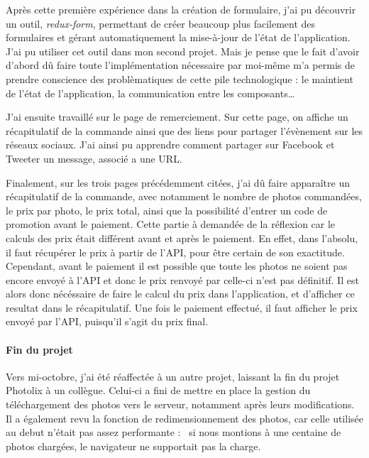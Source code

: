 \documentclass[12pt,a4paper]{article}
\begin{document}
  \bigskip

  Après cette première expérience dans la création de formulaire, j'ai pu
  découvrir un outil, \emph{redux-form}, permettant de créer beaucoup plus
  facilement des formulaires et gérant automatiquement la mise-à-jour de
  l'état de l'application. J'ai pu utiliser cet outil dans mon second
  projet. Mais je pense que le fait d'avoir d'abord dû faire toute
  l'implémentation nécessaire par moi-même m'a permis de prendre
  conscience des problèmatiques de cette pile technologique : le maintient
  de l'état de l'application, la communication entre les
  composants\ldots{}

  \bigskip

  J'ai ensuite travaillé sur le page de remerciement. Sur cette page, on
  affiche un récapitulatif de la commande ainsi que des liens pour
  partager l'évènement sur les réseaux sociaux. J'ai ainsi pu apprendre
  comment partager sur Facebook et Tweeter un message, associé a une URL.

  \bigskip

  Finalement, sur les trois pages précédemment citées, j'ai dû faire
  apparaître un récapitulatif de la commande, avec notamment le nombre de
  photos commandées, le prix par photo, le prix total, ainsi que la
  possibilité d'entrer un code de promotion avant le paiement. Cette
  partie à demandée de la réflexion car le calculs des prix était
  différent avant et après le paiement. En effet, dans l'absolu, il faut
  récupérer le prix à partir de l'API, pour être certain de son
  exactitude. Cependant, avant le paiement il est possible que toute les
  photos ne soient pas encore envoyé à l'API et donc le prix renvoyé par
  celle-ci n'est pas définitif. Il est alors donc nécéssaire de faire le
  calcul du prix dans l'application, et d'afficher ce resultat dans le
  récapitulatif. Une fois le paiement effectué, il faut afficher le prix
  envoyé par l'API, puisqu'il s'agit du prix final.

  \bigskip

  \paragraph{Fin du projet}\label{fin-du-projet}

  \bigskip

  Vers mi-octobre, j'ai été réaffectée à un autre projet, laissant la fin
  du projet Photolix à un collègue. Celui-ci a fini de mettre en place la
  gestion du téléchargement des photos vers le serveur, notamment après
  leurs modifications. Il a également revu la fonction de
  redimensionnement des photos, car celle utilisée au debut n'était pas
  assez performante : ~si nous montions à une centaine de photos chargées,
  le navigateur ne supportait pas la charge.
\end{document}
